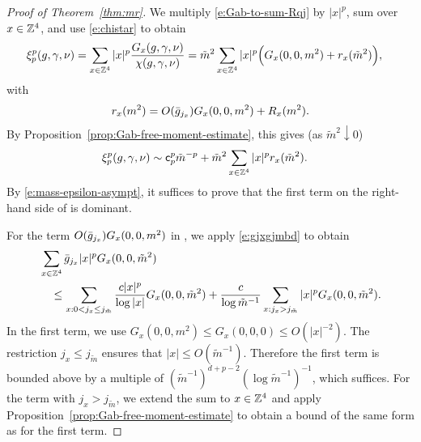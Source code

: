 \begin{proof}[Proof of Theorem~\ref{thm:mr}]
We multiply \eqref{e:Gab-to-sum-Rqj} by $|x|^p$, sum over $x \in {\mathbb Z}^4$,
and use \eqref{e:chistar}
to obtain
\begin{align}
\xi_p^p(g,\gamma,\nu)
	&=
\sum_{x \in {\mathbb Z}^4} |x|^p \frac{G_{x}(g, \gamma, \nu)}{\chi(g, \gamma, \nu)}
	=
\tilde m^2 \sum_{x \in {\mathbb Z}^4} |x|^p \Big(G_{x}(0, 0, m^2) + r_{x}(\tilde m^2) \Big),
\end{align}
with
\begin{equation}
\lbeq{rx}
    r_x(m^2) = O(\gbar_{j_x})  G_x(0, 0, m^2) + R_{x}(m^2).
\end{equation}
By
Proposition~\ref{prop:Gab-free-moment-estimate},
this gives (as $\tilde m^2 \downarrow 0$)
\begin{align}
\lbeq{ximasy}
\xi_p^p(g,\gamma,\nu)
	& \sim
{\sf c}_p^p \tilde m^{-p} +
\tilde m^2 \sum_{x \in \Z^4} |x|^p r_{x}(\tilde m^2).
\end{align}
By \eqref{e:mass-epsilon-asympt}, it suffices to prove that
the first term on the right-hand side of  is dominant.

For the term $O(\bar{g}_{j_x}) G_x(0, 0, m^2)$ in ,
we apply \eqref{e:gjxgjmbd} to obtain
\begin{align}
\lbeq{easyerror}
&\sum_{x \in \Z^4} \gbar_{j_x} |x|^p G_x(0, 0, \tilde m^2)
	\nnb & \quad \le
\sum_{x : 0 < j_x \le j_{\tilde m}} \frac{c |x|^p}{\log |x|} G_x(0, 0, \tilde m^2)
	+
\frac{c}{\log \tilde m^{-1}} \sum_{x : j_x >j_{\tilde m}}  |x|^p G_x(0, 0, \tilde m^2).
\end{align}
In the first term,
we use $G_x(0, 0, m^2) \le G_x(0, 0, 0) \le O(|x|^{-2})$.
The restriction $j_x \le j_{\tilde m}$ ensures that $|x| \le O(\tilde m^{-1})$.
Therefore the first term is bounded above by a multiple of
$(\tilde m^{-1})^{d+p-2}(\log \tilde m^{-1})^{-1}$, which suffices.
For the term with $j_x > j_{\tilde m}$, we extend the sum to $x \in {\mathbb Z}^4$
and apply Proposition~\ref{prop:Gab-free-moment-estimate}
to obtain a bound of the same form as for the first term.


\end{proof}
